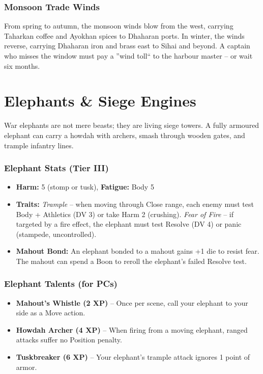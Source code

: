 \documentclass[12pt,oneside]{book}
\begin{document}
\subsection*{Monsoon Trade Winds}
From spring to autumn, the monsoon winds blow from the west, carrying Taharkan coffee and Ayokhan spices to Dhaharan ports. In winter, the winds reverse, carrying Dhaharan iron and brass east to Sihai and beyond. A captain who misses the window must pay a ''wind toll`` to the harbour master -- or wait six months.

\chapter{Elephants \& Siege Engines}

War elephants are not mere beasts; they are living siege towers. A fully armoured elephant can carry a howdah with archers, smash through wooden gates, and trample infantry lines.

\subsection*{Elephant Stats (Tier III)}
\begin{itemize}
  \item \textbf{Harm:} 5 (stomp or tusk), \textbf{Fatigue:} Body 5
  \item \textbf{Traits:} \textit{Trample} -- when moving through Close range, each enemy must test Body + Athletics (DV 3) or take Harm 2 (crushing). \textit{Fear of Fire} -- if targeted by a fire effect, the elephant must test Resolve (DV 4) or panic (stampede, uncontrolled).
  \item \textbf{Mahout Bond:} An elephant bonded to a mahout gains +1 die to resist fear. The mahout can spend a Boon to reroll the elephant's failed Resolve test.
\end{itemize}

\subsection*{Elephant Talents (for PCs)}
\begin{itemize}
  \item \textbf{Mahout's Whistle (2 XP)} -- Once per scene, call your elephant to your side as a Move action.
  \item \textbf{Howdah Archer (4 XP)} -- When firing from a moving elephant, ranged attacks suffer no Position penalty.
  \item \textbf{Tuskbreaker (6 XP)} -- Your elephant's trample attack ignores 1 point of armor.
\end{itemize}
\end{document}
